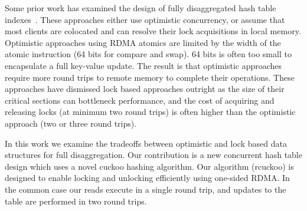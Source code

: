 Some prior work has examined the design of fully
disaggregated hash table indexes~\cite{sherman, race, fusee,
rolex}.  These approaches either use optimistic concurrency,
or assume that most clients are colocated and can resolve
their lock acquisitions in local memory. Optimistic
approaches using RDMA atomics are limited by the width of
the atomic instruction (64 bits for compare and swap). 64
bits is often too small to encapsulate a full key-value
update. The result is that optimistic approaches require
more round trips to remote memory to complete their
operations. These approaches have dismissed lock based
approaches outright as the size of their critical sections
can bottleneck performance, and  the cost of acquiring and
releasing locks (at minimum two round trips) is often higher
than the optimistic approach (two or three round trips).



In this work we examine the tradeoffs between optimistic and
lock based data structures for full disaggregation. Our
contribution is a new concurrent hash table design which
uses a novel cuckoo hashing algorithm. Our algorithm
(rcuckoo) is designed to enable locking and unlocking
efficiently using one-sided RDMA. In the common case our
reads execute in a single round trip, and updates to the
table are performed in two round trips. 

